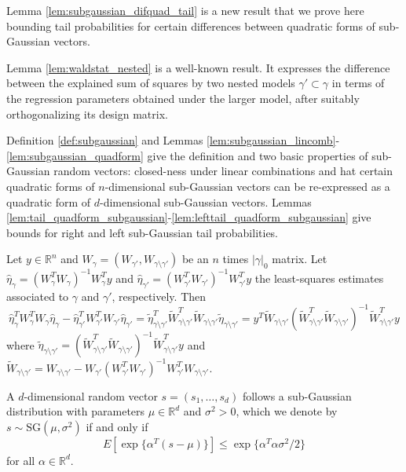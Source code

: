 Lemma \ref{lem:subgaussian_difquad_tail} is a new result that we prove here bounding tail probabilities for certain differences between quadratic forms of sub-Gaussian vectors.

Lemma \ref{lem:waldstat_nested} is a well-known result. It expresses the difference between the explained sum of squares by two nested models $\gamma' \subset \gamma$ in terms of the regression parameters obtained under the larger model, after suitably orthogonalizing its design matrix.

Definition \ref{def:subgaussian} and Lemmas \ref{lem:subgaussian_lincomb}-\ref{lem:subgaussian_quadform} give the definition and two basic properties of 
sub-Gaussian random vectors: closed-ness under linear combinations and hat certain quadratic forms of $n$-dimensional sub-Gaussian vectors can be re-expressed as a quadratic form of $d$-dimensional sub-Gaussian vectors.
Lemmas \ref{lem:tail_quadform_subgaussian}-\ref{lem:lefttail_quadform_subgaussian} give bounds for right and left sub-Gaussian tail probabilities.


\begin{lemma}
  Let $y \in \mathbb{R}^n$ and $W_\gamma= (W_{\gamma'}, W_{\gamma \setminus \gamma'})$ be an $n$ times $|\gamma|_0$ matrix.
  Let $\hat{\eta}_\gamma= (W_\gamma^T W_\gamma)^{-1} W_\gamma^T y$
  and $\hat{\eta}_{\gamma'}= (W_{\gamma'}^T W_{\gamma'})^{-1} W_{\gamma'}^T y$
  the least-squares estimates associated to $\gamma$ and $\gamma'$, respectively.
Then
$$  \hat{\eta}_{\gamma}^T W_{\gamma}^TW_{\gamma} \hat{\eta}_{\gamma} - \hat{\eta}_{\gamma'}^T W_{\gamma'}^TW_{\gamma'} \hat{\eta}_{\gamma'}
=\tilde{\eta}_{\gamma \setminus \gamma'}^T \tilde{W}_{\gamma \setminus \gamma'}^T\tilde{W}_{\gamma \setminus \gamma'} \tilde{\eta}_{\gamma \setminus \gamma'}=
y^T \tilde{W}_{\gamma \setminus \gamma'} (\tilde{W}_{\gamma \setminus \gamma'}^T \tilde{W}_{\gamma \setminus \gamma'})^{-1} \tilde{W}_{\gamma \setminus \gamma'}^T y
$$
where $\tilde{\eta}_{\gamma \setminus \gamma'}= (\tilde{W}_{\gamma \setminus \gamma'}^T\tilde{W}_{\gamma \setminus \gamma'})^{-1} \tilde{W}_{\gamma \setminus \gamma'}^T y$
and $\tilde{W}_{\gamma \setminus \gamma'}= W_{\gamma \setminus \gamma'} - W_{\gamma'}(W_{\gamma'}^TW_{\gamma'})^{-1}W_{\gamma'}^TW_{\gamma \setminus \gamma'}$.
\label{lem:waldstat_nested}
\end{lemma}



\begin{defn}
A $d$-dimensional random vector $s=(s_1,\ldots,s_d)$ follows a sub-Gaussian distribution with parameters $\mu \in \mathbb{R}^d$ and $\sigma^2 > 0$, which we denote by $s \sim \mbox{SG}(\mu,\sigma^2)$ if and only if
$$
E\left[ \exp\{ \alpha^T(s - \mu) \} \right] \leq \exp\{ \alpha^T\alpha \sigma^2/2 \}
$$
for all $\alpha \in \mathbb{R}^d$.
\label{def:subgaussian}
\end{defn}

